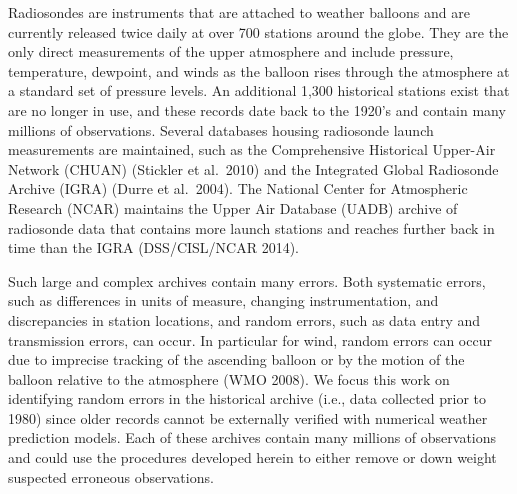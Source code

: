 \documentclass[12pt]{article}
\begin{document}
\begin{doublespacing}



Radiosondes  are instruments that are attached to weather balloons and are currently released twice daily at over 700 stations around the globe.  They are the only direct measurements of the upper atmosphere and include pressure, temperature, dewpoint, and winds  as the balloon rises through the atmosphere at a standard set of pressure levels.  An additional 1,300 historical stations exist that are no longer in use, and these records  date back to the 1920's and contain many millions of observations.  Several databases housing radiosonde launch measurements are maintained, such as   the Comprehensive Historical Upper-Air Network (CHUAN) (Stickler et al.~2010) and the Integrated Global Radiosonde Archive (IGRA) (Durre et al.~2004).  The National Center for Atmospheric Research (NCAR) maintains the Upper Air Database (UADB) archive of radiosonde data that contains more launch stations and reaches further back in time than the IGRA (DSS/CISL/NCAR 2014).  

Such large and complex archives contain many errors.  Both systematic errors, such as differences in units of measure, changing instrumentation, and discrepancies in station locations, and random errors, such as data entry and transmission errors, can occur. In particular for wind, random errors can occur due to imprecise tracking of the ascending balloon or by the motion of the balloon relative to the atmosphere (WMO 2008). We focus this work on identifying random errors in the historical archive (i.e., data collected prior to 1980)  since  older records cannot be externally verified with numerical weather prediction models. Each of these archives contain many millions of observations and could use the procedures developed herein to either remove or down weight suspected erroneous observations.  



\end{doublespacing}
\end{document}

